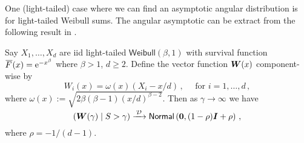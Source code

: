 One (light-tailed) case where we can find an asymptotic angular distribution is for light-tailed Weibull sums. The angular asymptotic can be extract from the following result in \cite{asmussen2017tail}.

\begin{proposition} \label{prop:light_weibull_angles}
Say $X_1, \dots, X_d$ are iid light-tailed $\mathsf{Weibull}(\beta, 1)$ with survival function $\Ftail(x)=\e^{-x^\beta}$ where $\beta>1$, $d \ge 2$.
Define the vector function $\bm{W}(x)$ component-wise by
\[ W_i(x) = \omega(x) ( X_i - x/d) \,, \quad \text{ for } i=1,\dots,d\,, \]
where $\omega(x) := \sqrt{2  \beta (\beta-1) (x/d)^{\beta-2}}$.
Then as $\gamma \to \infty$ we have
\[ (\bm{W}(\gamma) \mid S > \gamma) \xrightarrow{\:\smash{\mathcal{D}}\:} \mathsf{Normal}\left(\bm{0}, (1 - \rho) \bm{I} + \rho \right) \,,\]
where $\rho = -1/(d-1)$.
\end{proposition}











